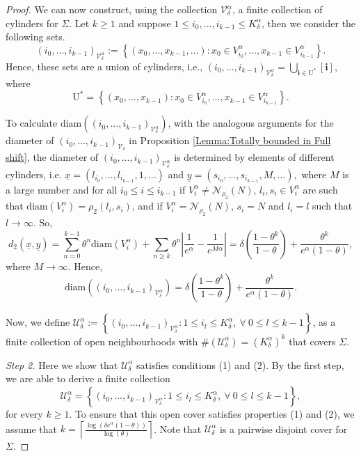 \documentclass[10pt,a4paper]{amsart}
\def\U{\ensuremath{\mathcal U}}
\def\i{\textbf{i}}
\def\st{such that }
\def\ulx{\underline{x}}
\def\uly{\underline{y}}
\begin{document}
\begin{proof}
We can now construct, using the collection $\mathcal{V}_\delta^{\alpha}$, a finite collection of cylinders for $\Sigma$. Let $k\ge 1$ and suppose $1\le i_0,\ldots,i_{k-1}\le K_\delta^{\alpha}$, then we consider the following sets.
\begin{equation}\label{Def: Z_i_0 d_2+}
(i_0,\ldots,i_{k-1})_{\mathcal{V}_\delta^{\alpha}}:=\left\{ (x_0,\ldots,x_{k-1},\ldots): x_0\in V_{i_0}^{\alpha},\ldots,x_{k-1}\in V_{i_{k-1}}^{\alpha}  \right\}.\end{equation}
Hence, these sets are a union of cylinders, i.e., $(i_0,\ldots,i_{k-1})_{\mathcal{V}_\delta^{\alpha}}=\bigcup_{\i\in\mathrm{U^*}}[\i]$, where $$\mathrm{U^*}=\left\{ (x_0,\ldots,x_{k-1}):  x_0\in V_{i_0}^{\alpha},\ldots,x_{k-1}\in V_{i_{k-1}}^{\alpha}    \right\}.$$ 

To calculate $\text{diam}\left((i_0,\ldots,i_{k-1})_{\mathcal{V}_\delta^{\alpha}}\right)$, with the analogous arguments for the diameter of $(i_0,\ldots,i_{k-1})_{\mathcal{V}_\delta}$ in Proposition \ref{Lemma:Totally bounded in Full shift}, the diameter of $(i_0,\ldots,i_{k-1})_{\mathcal{V}_\delta^{\alpha}}$ is determined by elements of different cylinders, i.e. $\ulx=(l_{i_0},\ldots,l_{i_{k-1}},1,\ldots)$ and $\uly=(s_{i_0},\ldots,s_{i_{k-1}},M,\ldots),$
where $M$ is a large number and for all $i_0\le i\le i_{k-1}$ if $V_i^\alpha\neq\mathcal{N}_{\rho_2}(N)$, $l_i,s_i\in V_i^\alpha$ are \st $\text{diam}(V_i^\alpha)={\rho_2}(l_i,s_i)$, and if $V_i^\alpha=\mathcal{N}_{\rho_2}(N)$, $s_i=N$ and $l_i=l$ \st $l\to\infty$. So, $$ d_2(\ulx,\underline{y})=\sum_{n=0}^{k-1} \theta^n \text{diam}(V_i^{\alpha})+\sum_{n\ge k} \theta^n \left| \frac{1}{e^\alpha} - \frac{1}{e^{M\alpha}} \right|=  \delta\left(\frac{1-\theta^k}{1-\theta}\right)+\frac{\theta^k}{e^\alpha(1-\theta)},$$
where $M\to\infty$. 
Hence, 
\begin{equation} \label{Diam_Union_Full d_2+}
\text{diam}\left((i_0,\ldots,i_{k-1})_{\mathcal{V}_\delta^{\alpha}}\right)=\delta\left(\frac{1-\theta^k}{1-\theta}\right)+\frac{\theta^k}{e^\alpha(1-\theta)}.
\end{equation} 

Now, we define $\U_{\delta}^{\alpha}:=\left\{(i_0,\ldots,i_{k-1})_{\mathcal{V}_\delta^{\alpha}}: 1\le i_l\le K_{\delta}^{\alpha}, \ \forall \ 0\le l\le k-1 \right\}$, as a finite collection of open neighbourhoods with $\#(\U_{\delta}^{\alpha})=(K_\delta^{\alpha})^k$ that covers $\Sigma$.

\textit{Step 2.} Here we show that $\U_{\delta}^{\alpha}$ satisfies conditions (1) and (2). By the first step, we are able to derive a finite collection $$\U_{\delta}^{\alpha}=\left\{(i_0,\ldots,i_{k-1})_{\mathcal{V}_\delta^{\alpha}}: 1\le i_l\le K_{\delta}^{\alpha}, \ \forall \ 0\le l\le k-1 \right\},$$ for every $k\ge 1$. To ensure that this open cover satisfies properties (1) and (2), we assume that $k=\left\lceil \frac{\log(\delta e^{\alpha}(1-\theta))}{\log(\theta)}\right\rceil$.  Note that $\U_{\delta}^{\alpha}$ is a pairwise disjoint cover for $\Sigma$.


\end{proof}
\end{document}
